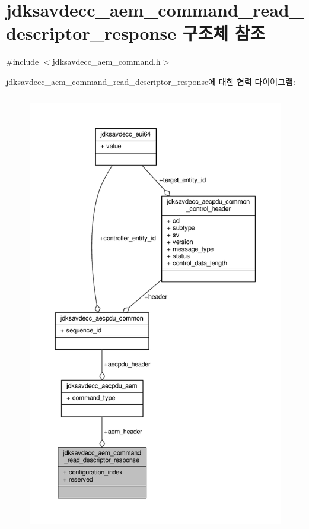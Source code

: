 \hypertarget{structjdksavdecc__aem__command__read__descriptor__response}{}\section{jdksavdecc\+\_\+aem\+\_\+command\+\_\+read\+\_\+descriptor\+\_\+response 구조체 참조}
\label{structjdksavdecc__aem__command__read__descriptor__response}


{\ttfamily \#include $<$jdksavdecc\+\_\+aem\+\_\+command.\+h$>$}



jdksavdecc\+\_\+aem\+\_\+command\+\_\+read\+\_\+descriptor\+\_\+response에 대한 협력 다이어그램\+:
\nopagebreak
\begin{figure}[H]
\begin{center}
\leavevmode
\includegraphics[height=550pt]{structjdksavdecc__aem__command__read__descriptor__response__coll__graph}
\end{center}
\end{figure}
